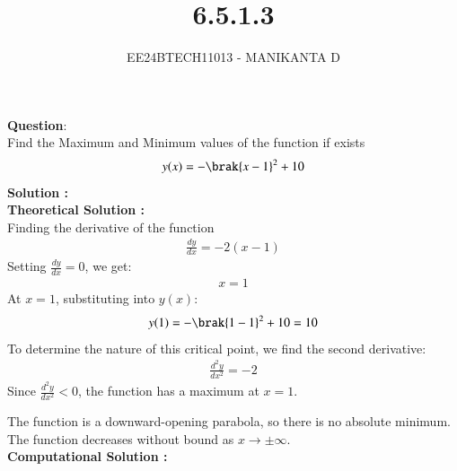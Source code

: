 \documentclass[journal]{IEEEtran}
\begin{document}

\vspace{3cm}

\title{6.5.1.3}
\author{EE24BTECH11013 - MANIKANTA D}
{\let\newpage\relax\maketitle}

\renewcommand{\thefigure}{\theenumi}
\renewcommand{\thetable}{\theenumi}
\setlength{\intextsep}{10pt} %

\renewcommand{\thetable}{\theenumi}
\textbf{Question}:\\
Find the Maximum and Minimum values of the function if exists \\
 \begin{align*}
     y (x) = -\brak{x-1}^2+10
 \end{align*}  
\textbf{Solution : }\\
\textbf{Theoretical Solution :}\\

Finding the derivative of the function\\
\begin{align}
    \frac{dy}{dx} = -2(x-1)
\end{align}
Setting $\frac{dy}{dx} = 0$, we get:
\begin{align}
    x = 1
\end{align}
At $x = 1$, substituting into $y(x)$:
\begin{align}
    y(1) = -\brak{1-1}^2 + 10 = 10
\end{align}
To determine the nature of this critical point, we find the second derivative:
\begin{align}
    \frac{d^2y}{dx^2} = -2
\end{align}
Since $\frac{d^2y}{dx^2} < 0$, the function has a maximum at $x = 1$.

The function is a downward-opening parabola, so there is no absolute minimum. The function decreases without bound as $x \to \pm\infty$.\\

\textbf{Computational Solution :}\\
\end{document}
